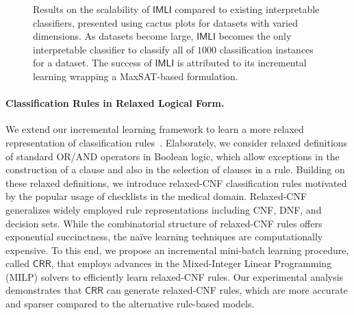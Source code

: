 \documentclass{article}
\begin{document}
\begin{figure}[!b]
		
		\caption{Results on the scalability of $ \mathsf{IMLI} $ compared to existing interpretable classifiers, presented using cactus plots for datasets with varied dimensions. As datasets become large, $ \mathsf{IMLI} $ becomes the only interpretable classifier to classify all of $ 1000 $ classification instances for a dataset. The success of $ \mathsf{IMLI} $ is attributed to its incremental learning wrapping a MaxSAT-based formulation.}
		\label{fig:scalability_imli}
	\end{figure}
	
	
	\paragraph{Classification Rules in Relaxed Logical Form.} We extend our incremental learning framework to learn a more relaxed representation of classification rules~\cite{ghosh2020classification}. Elaborately, we consider relaxed definitions of standard OR/AND operators in Boolean logic, which allow exceptions in the construction of a clause and also in the selection of clauses in a rule. Building on these relaxed definitions, we introduce relaxed-CNF classification rules motivated by the popular usage of checklists in the medical domain. Relaxed-CNF generalizes widely employed rule representations including CNF, DNF, and decision sets. While the combinatorial structure of relaxed-CNF rules offers exponential succinctness, the na\"ive learning techniques are computationally expensive. To this end, we propose an incremental mini-batch learning procedure, called $ \mathsf{CRR} $, that employs advances in the Mixed-Integer Linear Programming (MILP) solvers to efficiently learn relaxed-CNF rules. Our experimental analysis demonstrates that $ \mathsf{CRR} $ can generate relaxed-CNF rules, which are more accurate and sparser compared to the alternative rule-based models.
	
\end{document}
